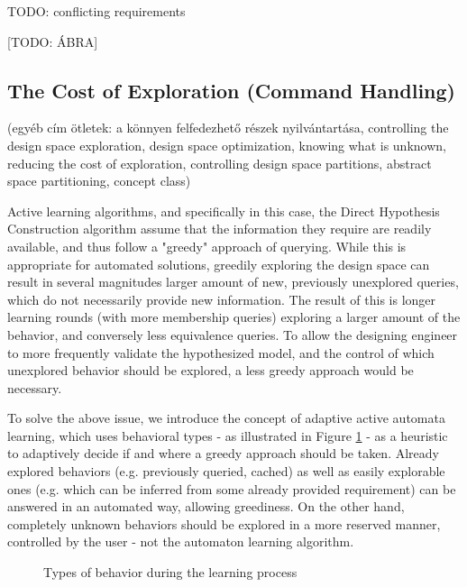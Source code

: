 TODO: conflicting requirements

[TODO: ÁBRA]
\subsection{The Cost of Exploration (Command Handling)} \label{subs_commandhandling}
(egyéb cím ötletek: a könnyen felfedezhető részek nyilvántartása, controlling the design space exploration, design space optimization, knowing what is unknown, reducing the cost of exploration, controlling design space partitions, abstract space partitioning, concept class)

Active learning algorithms, and specifically in this case, the Direct Hypothesis Construction algorithm assume that the information they require are readily available, and thus follow a "greedy" approach of querying. While this is appropriate for automated solutions, greedily exploring the design space can result in several magnitudes larger amount of new, previously unexplored queries, which do not necessarily provide new information. The result of this is longer learning rounds (with more membership queries) exploring a larger amount of the behavior, and conversely less equivalence queries. To allow the designing engineer to more frequently validate the hypothesized model, and the control of which unexplored behavior should be explored, a less greedy approach would be necessary.

To solve the above issue, we introduce the concept of adaptive active automata learning, which uses behavioral types - as illustrated in Figure \ref{fig_architcture_commandhandling} - as a heuristic to adaptively decide if and where a greedy approach should be taken. Already explored behaviors (e.g. previously queried, cached) as well as easily explorable ones (e.g. which can be inferred from some already provided requirement)  can be answered in an automated way, allowing greediness. On the other hand, completely unknown behaviors should be explored in a more reserved manner, controlled by the user - not the automaton learning algorithm.

\begin{figure}[!ht] 
	\centering
	\caption{Types of behavior during the learning process} 
	\label{fig_architcture_commandhandling}
\end{figure} %

